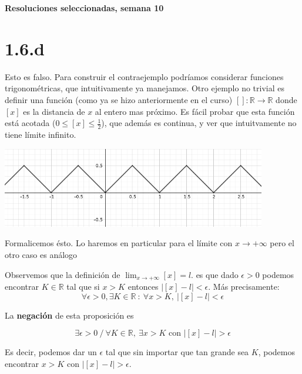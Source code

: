 \documentclass[10pt,a4paper]{article}
\begin{document}
\vspace{0,3cm}

\begin{center}
{\bf \Large Resoluciones seleccionadas, semana 10}
\end{center}


\vspace{0,3cm}

\section*{1.6.d}\emph{}

\noindent
Esto es falso.
Para construir el contraejemplo podr\'iamos considerar funciones
trigonom\'etricas, que intuitivamente ya manejamos.
Otro ejemplo no trivial es definir una funci\'on
(como ya se hizo anteriormente en el curso)
$[ ] : \mathbb{R}\rightarrow\mathbb{R}$ donde $[x]$ es la distancia
de $x$ al entero mas pr\'oximo.
Es f\'acil probar que esta funci\'on est\'a acotada
($0\leq[x]\leq\frac{1}{2}$), que adem\'as es continua,
y ver que intuitvamente no tiene l\'imite
infinito.


\begin{center}
\includegraphics[height=3.5cm]{./imgs/function}
\end{center}




Formalicemos \'esto. Lo haremos en particular para el l\'imite
con $ x \rightarrow +\infty$
pero el otro caso es an\'alogo

\noindent
Observemos que la definici\'on de $\displaystyle{\lim_{x\rightarrow +\infty}
  [x]= l}$.
es que dado $\epsilon > 0$ podemos encontrar
$K\in\mathbb{R}$ tal que si $x > K$ entonces $|[x]-l|<\epsilon$.
M\'as precisamente:
$$
\forall \epsilon>0, \exists K\in\mathbb{R} \: : \: \forall x>K, \: |[x]-l|<
\epsilon
$$

\noindent
La {\bf negaci\'on} de esta proposici\'on es 

$$
\displaystyle{
\exists \epsilon>0 \: / \:
\forall K\in\mathbb{R}, \: \exists x>K \text{ con }
\left|[x]-l\right|>\epsilon}
$$

\noindent
Es decir, podemos dar un $\epsilon$ tal que sin importar que tan grande sea
$K$, podemos encontrar $x>K$ con $|[x]-l|>\epsilon$.
\end{document}
